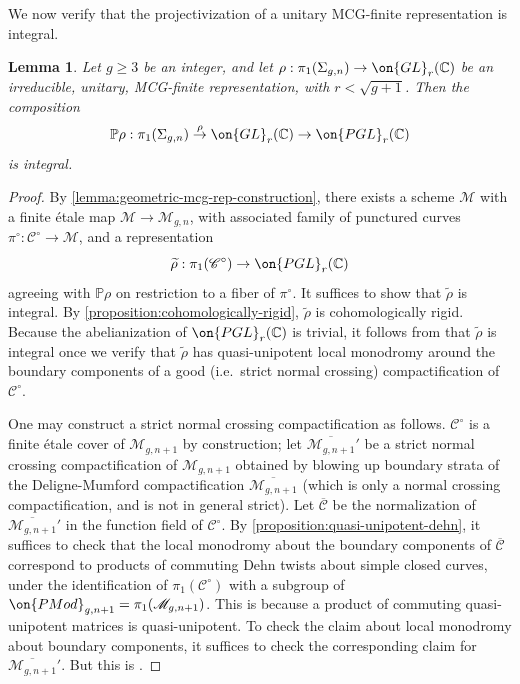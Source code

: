 \documentclass[12 pt]{amsart}
\theoremstyle{plain}
\newtheorem{lemma}[subsubsection]{Lemma}
\theoremstyle{definition}
\theoremstyle{remark}
\numberwithin{equation}{section}
\begin{document}
We now verify that the projectivization of a unitary MCG-finite representation is integral.
\begin{lemma}
	\label{lemma:defined-over-number-field}
	Let $g\geq 3$ be an integer, and let $\rho: \pi_1(\Sigma_{g,n})\to \on{GL}_r(\mathbb{C})$ be an irreducible, unitary, MCG-finite representation, with $r<\sqrt{g+1}$. Then the composition $$\mathbb{P}\rho: \pi_1(\Sigma_{g,n})\overset{\rho}{\to} \on{GL}_r(\mathbb{C})\to \on{PGL}_r(\mathbb{C})$$ is integral.
\end{lemma}
\begin{proof}
By \autoref{lemma:geometric-mcg-rep-construction}, there exists a scheme $\mathscr{M}$ with a finite \'etale map $\mathscr{M}\to \mathscr{M}_{g,n}$, with associated family of punctured curves $\pi^\circ: \mathscr{C}^\circ\to \mathscr{M}$, and a representation $$\widetilde{\rho}: \pi_1(\mathscr{C}^\circ)\to \on{PGL}_r(\mathbb{C})$$ agreeing with $\mathbb{P}\rho$ on restriction to a fiber of $\pi^\circ$. It suffices to show that $\widetilde{\rho}$ is integral.  
	By \autoref{proposition:cohomologically-rigid},
	$\widetilde{\rho}$ is cohomologically rigid.
	Because the abelianization of $\on{PGL}_r(\mathbb C)$ is
	trivial, it follows from
\cite[Theorem 1.2]{klevdalP:g-rigid-local-systems-are-integral}	that $\widetilde\rho$
is integral once we verify that $\widetilde\rho$ has quasi-unipotent local monodromy around the boundary components of
	a good (i.e.~strict normal crossing) compactification of $\mathscr{C}^\circ$.

One may construct a strict normal crossing compactification as follows.
$\mathscr{C}^\circ$ is a finite \'etale cover of $\mathscr{M}_{g,n+1}$ by
construction; let $\overline{\mathscr{M}_{g, n+1}}'$ be a strict normal crossing
compactification of $\mathscr{M}_{g,n+1}$ obtained by blowing up boundary strata
of the Deligne-Mumford compactification $\overline{\mathscr{M}_{g,n+1}}$ (which
is only a normal crossing compactification, and is not in general strict). Let
$\overline{\mathscr{C}}$ be the normalization of $\overline{\mathscr{M}_{g,
n+1}}'$ in the function field of $\mathscr{C}^\circ$. By
\autoref{proposition:quasi-unipotent-dehn}, it suffices to check that the local
monodromy about the boundary components of $\overline{\mathscr{C}}$ correspond
to products of commuting Dehn twists about simple closed curves, under the
identification of $\pi_1(\mathscr{C}^\circ)$ with a subgroup of
$\on{PMod}_{g,n+1}=\pi_1(\mathscr{M}_{g,n+1})$. 
This is because a product of
commuting quasi-unipotent matrices is quasi-unipotent. To check the claim about
local monodromy about boundary components, it suffices to check the
corresponding claim for $\overline{\mathscr{M}_{g, n+1}}'$. But this is
\cite[Lemma 2.1.1]{li2020surface}.
\end{proof}
\end{document}
